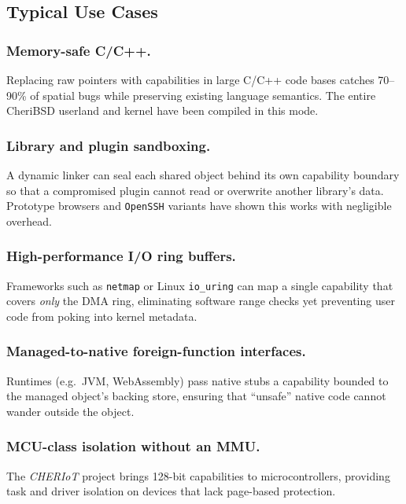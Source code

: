 \documentclass[sigconf]{acmart}
\begin{document}
\subsection{Typical Use Cases}

\subsubsection{Memory-safe C/C++.}
Replacing raw pointers with capabilities in large C/C++ code bases catches 70–90\% of spatial bugs while preserving existing language semantics.  The entire CheriBSD userland and kernel have been compiled in this mode.

\subsubsection{Library and plugin sandboxing.}
A dynamic linker can seal each shared object behind its own capability boundary so that a compromised plugin cannot read or overwrite another library’s data.  Prototype browsers and \texttt{OpenSSH} variants have shown this works with negligible overhead.

\subsubsection{High-performance I/O ring buffers.}
Frameworks such as \texttt{netmap} or Linux \texttt{io\_uring} can map a single capability that covers \emph{only} the DMA ring, eliminating software range checks yet preventing user code from poking into kernel metadata.

\subsubsection{Managed-to-native foreign-function interfaces.}
Runtimes (e.g.\ JVM, WebAssembly) pass native stubs a capability bounded to the managed object’s backing store, ensuring that “unsafe” native code cannot wander outside the object.

\subsubsection{MCU-class isolation without an MMU.}
The \textit{CHERIoT} project brings 128-bit capabilities to microcontrollers, providing task and driver isolation on devices that lack page-based protection.
\end{document}
